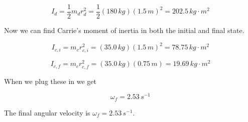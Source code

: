 \documentclass[12pt]{book}
\begin{document}
\begin{exampleblock}
\begin{equation}
I_d = \frac{1}{2} m_d r_d^2 = \frac{1}{2} (180 \, kg) (1.5 \, m)^2 = 202.5 \, kg \cdot m^2
\end{equation}

Now we can find Carrie's moment of inertia in both the initial and final state.

\begin{equation}
I_{c,i} = m_c r_{c,i}^2 = (35.0 \, kg)(1.5 \, m)^2 = 78.75 \, kg \cdot m^2
\end{equation}

\begin{equation}
I_{c,f} = m_c r_{c,f}^2 = (35.0 \, kg)(0.75 \, m) = 19.69 \, kg \cdot m^2
\end{equation}

When we plug these in we get

\begin{equation}
\omega_f = 2.53 \, s^{-1}
\end{equation}

The final angular velocity is $\omega_f = 2.53 \, s^{-1}$.

\end{exampleblock}
\end{document}
